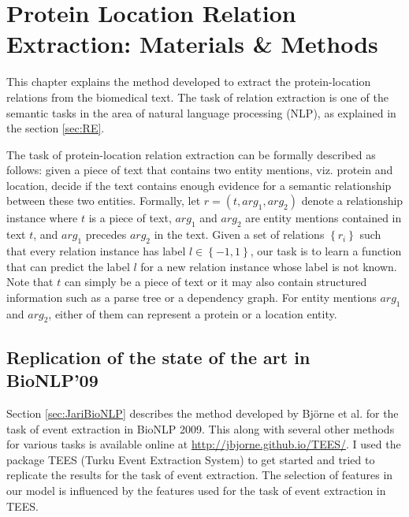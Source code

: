 \chapter{Protein Location Relation Extraction: Materials \& Methods}\label{chapter:methods}
\newcommand*{\xml}[1]{\texttt{<#1>}}

This chapter explains the method developed to extract the protein-location relations from the biomedical text. The task of relation extraction is one of the semantic tasks in the area of natural language processing (NLP), as explained in the section \ref{sec:RE}.

The task of protein-location relation extraction can be formally described as follows: given a piece of text that contains two entity mentions, viz. protein and location, decide if the text contains enough evidence for a semantic relationship between these two entities. Formally, let $r=(t,arg_1,arg_2)$ denote a relationship instance where $t$ is a piece of text, $arg_1$ and $arg_2$ are entity mentions contained in text $t$, and $arg_1$ precedes $arg_2$ in the text. Given a set of relations $\left\lbrace r_i \right\rbrace$ such that every relation instance has label $l \in \left\lbrace-1,1\right\rbrace$, our task is to learn a function that can predict the label $l$ for a new relation instance whose label is not known. Note that $t$ can simply be a piece of text or it may also contain structured information such as a parse tree or a dependency graph. For entity mentions $arg_1$ and $arg_2$, either of them can represent a protein or a location entity.

\section{Replication of the state of the art in BioNLP'09}

Section \ref{sec:JariBioNLP} describes the method developed by Björne et al. \cite{bjorne2009extracting} for the task of event extraction in BioNLP 2009. This along with several other methods for various tasks is available online at \url{http://jbjorne.github.io/TEES/}. I used the package TEES (Turku Event Extraction System) \cite{teesonline} to get started and tried to replicate the results for the task of event extraction. The selection of features in our model is influenced by the features used for the task of event extraction in TEES.

